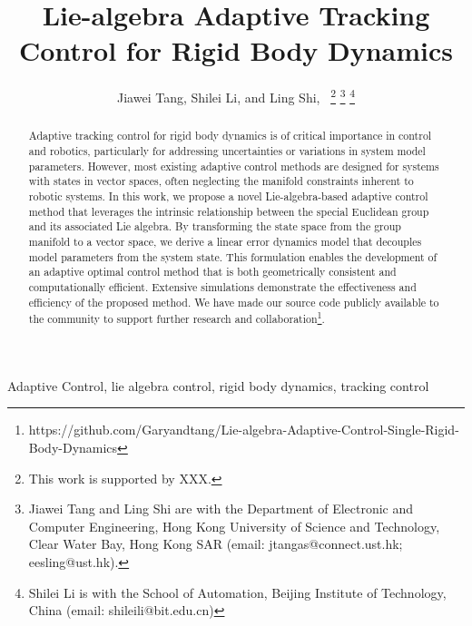 \documentclass[lettersize,journal]{IEEEtran}
\begin{document}
\title{\LARGE Lie-algebra Adaptive Tracking Control for Rigid Body Dynamics}

\author{Jiawei Tang, Shilei Li, and Ling Shi,~
\thanks{This work is supported by XXX.}
	\thanks{Jiawei Tang and Ling Shi are with the Department of Electronic and Computer Engineering, Hong Kong University of Science and Technology, Clear Water Bay, Hong Kong SAR (email: jtangas@connect.ust.hk; eesling@ust.hk).}
  \thanks{Shilei Li is with the School of Automation, Beijing Institute of Technology, China (email:  shileili@bit.edu.cn)}
	}



\maketitle

\begin{abstract}
Adaptive tracking control for rigid body dynamics is of critical importance in control and robotics, particularly for addressing uncertainties or variations in system model parameters. However, most existing adaptive control methods are designed for systems with states in vector spaces, often neglecting the manifold constraints inherent to robotic systems. In this work, we propose a novel Lie-algebra-based adaptive control method that leverages the intrinsic relationship between the special Euclidean group and its associated Lie algebra. By transforming the state space from the group manifold to a vector space, we derive a linear error dynamics model that decouples model parameters from the system state. This formulation enables the development of an adaptive optimal control method that is both geometrically consistent and computationally efficient. Extensive simulations demonstrate the effectiveness and efficiency of the proposed method. We have made our source code publicly available to the community to support further research and collaboration\footnote{https://github.com/Garyandtang/Lie-algebra-Adaptive-Control-Single-Rigid-Body-Dynamics}.
\end{abstract}
\IEEEpeerreviewmaketitle
\begin{IEEEkeywords}
Adaptive Control, lie algebra control, rigid body dynamics, tracking control
\end{IEEEkeywords}
\end{document}
